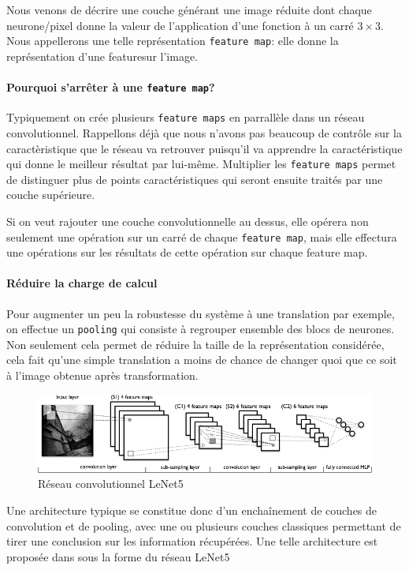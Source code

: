 \documentclass[a4paper,11pt]{article}
\begin{document}
Nous venons de décrire une couche générant une image réduite dont chaque
neurone/pixel donne la valeur de l'application d'une fonction à un carré
$3\times 3$. Nous appellerons une telle représentation \texttt{feature map}:
elle donne la représentation d'une \og feature\fg sur l'image.

\paragraph{Pourquoi s'arrêter à une \texttt{feature map}?}

Typiquement on crée plusieurs \texttt{feature maps} en parrallèle dans un réseau
convolutionnel. Rappellons déjà que nous n'avons pas beaucoup de contrôle sur la
caractèristique que le réseau va retrouver puisqu'il va apprendre la
caractéristique qui donne le meilleur résultat par lui-même. Multiplier les
\texttt{feature maps} permet de distinguer plus de points caractéristiques qui
seront ensuite traités par une couche supérieure.

Si on veut rajouter une couche convolutionnelle au dessus, elle opérera non
seulement une opération sur un carré de chaque \texttt{feature map}, mais elle
effectura une opérations sur les résultats de cette opération sur chaque feature
map.

\paragraph{Réduire la charge de calcul}

Pour augmenter un peu la robustesse du système à une translation par exemple, on
effectue un \texttt{pooling} qui consiste à regrouper ensemble des blocs de
neurones. Non seulement cela permet de réduire la taille de la représentation
considérée, cela fait qu'une simple translation a moins de chance de changer
quoi que ce soit à l'image obtenue après transformation.

\begin{figure}
  \centering
  \includegraphics[scale=0.8]{mylenet}
  \caption{Réseau convolutionnel LeNet5}
\end{figure}

Une architecture typique se constitue donc d'un enchaînement de couches de
convolution et de pooling, avec une ou plusieurs couches \og classiques\fg
permettant de tirer une conclusion sur les information récupérées. Une telle
architecture est proposée dans \cite{lecun1998gradient} sous la forme du réseau LeNet5
\end{document}
